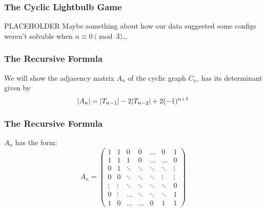 \documentclass{beamer}
\newcommand{\off}{white}
\DeclarePairedDelimiter\abs{\lvert}{\rvert}%
\begin{document}
\begin{frame}
    \frametitle{The Cyclic Lightbulb Game}
    PLACEHOLDER
    Maybe something about how our data suggested some configs weren't solvable when
    $n\equiv 0 \pmod{3}$\ldots

\begin{figure}[!h]
    \centering
\end{figure}
\end{frame}


\begin{frame}
\frametitle{The Recursive Formula}

We will show the adjacency matrix $A_n$ of the cyclic graph $C_n$, has its determinant
given by
\[
    \abs{A_n} = \abs{T_{n-1}} - 2\abs{T_{n-2}} + 2(-1)^{n+1}
\]
\end{frame}

\begin{frame}
\frametitle{The Recursive Formula}
    $A_n$ has the form:
    \[
        A_n=
        \begin{pmatrix}
            1 & 1 & 0 & 0 & \dots & 0 & 1\\
            1 & 1 & 1 & 0 & \dots & \dots & 0\\
            0 & 1 & \ddots & \ddots & \ddots & \ddots & \vdots\\
            0 & 0 & \ddots & \ddots & \ddots & \vdots & \vdots\\
            \vdots & \vdots & \ddots & \ddots & \ddots & \ddots & 0\\
            0 & \vdots & \dots & \ddots & \ddots & \ddots & 1\\
            1 & 0 & \dots & \dots & 0 & 1 & 1
        \end{pmatrix}
    \]
\end{frame}
\end{document}
